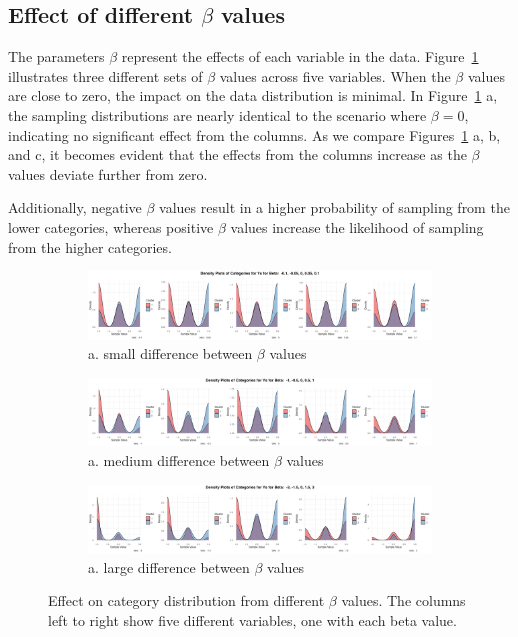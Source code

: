 \documentclass{article}
\begin{document}
\subsection{Effect of different $\beta$ values}
The parameters $\beta$ represent the effects of each variable in the data. 
Figure~\ref{fig:beta} illustrates three different sets of $\beta$ values across five variables. 
When the $\beta$ values are close to zero, the impact on the data distribution is minimal. 
In Figure~\ref{fig:beta} a, the sampling distributions are nearly identical to the scenario where $\beta = 0$, 
indicating no significant effect from the columns. 
As we compare Figures~\ref{fig:beta} a, b, and c, it becomes evident that the effects 
from the columns increase as the $\beta$ values deviate further from zero.

Additionally, negative $\beta$ values result in a higher probability of sampling from the lower categories, 
whereas positive $\beta$ values increase the likelihood of sampling from the higher categories.
\begin{figure}[htbp!]
  \centering
  \begin{subfigure}{1.0\textwidth}
      \centering
      \includegraphics[width=\textwidth]{images/para_sim/beta_1.png}
      \caption*{a. small difference between $\beta$ values}
  \end{subfigure}

  \begin{subfigure}{1.0\textwidth}
      \centering
      \includegraphics[width=\textwidth]{images/para_sim/beta_2.png}
      \caption*{a. medium difference between $\beta$ values}
    \end{subfigure}

  \begin{subfigure}{1.0\textwidth}
      \centering
      \includegraphics[width=\textwidth]{images/para_sim/beta_3.png}
      \caption*{a. large difference between $\beta$ values}
  \end{subfigure}
  
  \caption{Effect on category distribution from different $\beta$ values. The columns left to right show five different variables, one with each beta value.}
  \label{fig:beta}
\end{figure}
\end{document}
